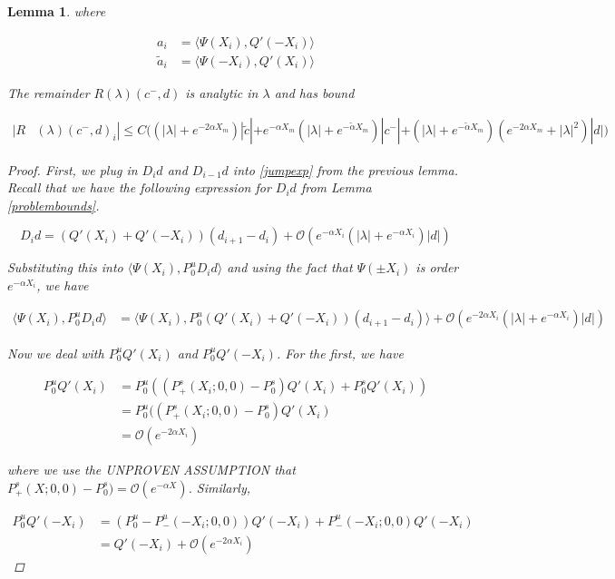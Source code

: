 \documentclass[12pt]{article}
\newtheorem{lemma}{Lemma}
\begin{document}
\begin{lemma}
where

\begin{align*}
a_i &= \langle \Psi(X_i), Q'(-X_i) \rangle \\
\tilde{a}_i &= \langle \Psi(-X_i), Q'(X_i) \rangle
\end{align*}

The remainder $R(\lambda)(c^-, d)$ is analytic in $\lambda$ and has bound

\begin{align*}
|R&(\lambda)(c^-, d)_i| \leq C \Big( (|\lambda| + e^{-2 \alpha X_m})|\tilde{c}| + e^{-\alpha X_m}(|\lambda| + e^{-\tilde{\alpha} X_m} )|c^-| + 
(|\lambda| + e^{-\tilde{\alpha} X_m} )( e^{-2 \alpha X_m} + |\lambda|^2)|d| \Big)
\end{align*}

\begin{proof}

First, we plug in $D_i d$ and $D_{i-1} d$ into \eqref{jumpexp} from the previous lemma. 
Recall that we have the following expression for $D_id $ from Lemma \ref{problembounds}.

\[
D_i d = ( Q'(X_i) + Q'(-X_i))(d_{i+1} - d_i ) + \mathcal{O} \left( e^{-\alpha X_i} \left( |\lambda| +  e^{-\alpha X_i}  \right) |d| \right)
\]

Substituting this into $\langle \Psi(X_i), P^u_0 D_i d \rangle$ and using the fact that $\Psi(\pm X_i)$ is order $e^{-\alpha X_i}$, we have

\begin{align*}
\langle \Psi(X_i), P^u_0 D_i d \rangle &= \langle \Psi(X_i), P^u_0 (Q'(X_i) + Q'(-X_i))(d_{i+1} - d_i ) \rangle + \mathcal{O} \left( e^{-2 \alpha X_i} \left( |\lambda| +  e^{-\alpha X_i}  \right) |d| \right)
\end{align*}

Now we deal with $P^u_0 Q'(X_i)$ and $P^u_0 Q'(-X_i)$. For the first, we have

\begin{align*}
P^u_0 Q'(X_i) &= P^u_0( (P^s_+(X_i; 0, 0) - P^s_0) Q'(X_i) + P^s_0 Q'(X_i) ) \\
&= P^u_0( (P^s_+(X_i; 0, 0) - P^s_0) Q'(X_i) \\
&= \mathcal{O}(e^{-2\alpha X_i})
\end{align*}

where we use the UNPROVEN ASSUMPTION that $P^s_+(X; 0, 0) - P^s_0) = \mathcal{O}(e^{-\alpha X})$. Similarly, 

\begin{align*}
P^u_0 Q'(-X_i) &= (P^u_0 - P^u_-(-X_i; 0, 0))Q'(-X_i) + P^u_-(-X_i; 0, 0)Q'(-X_i) \\
&= Q'(-X_i) + \mathcal{O}(e^{-2\alpha X_i})
\end{align*}


\end{proof}
\end{lemma}
\end{document}
